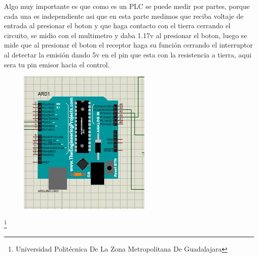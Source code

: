 \documentclass[11pt,a4paper]{article}
\begin{document}
Algo muy importante es que como es un PLC se puede medir por partes, porque cada una es independiente asi que en esta parte medimos que reciba voltaje de entrada al presionar el boton y que haga contacto con el tierra cerrando el circuito, se midio con el multimetro y daba 1.17v al presionar el boton, luego se mide que al presionar el boton el receptor haga su función cerrando el interruptor al detectar la emisión dando 5v en el pin que esta con la resistencia a tierra, aqui sera tu pin emisor hacia el control.

\begin{figure}[hbtp]
\centering
\includegraphics[scale=0.60]{arduino.png} 
\end{figure}


\footnote{Universidad Politécnica De La Zona Metropolitana De Guadalajara}

\newpage
\end{document}
